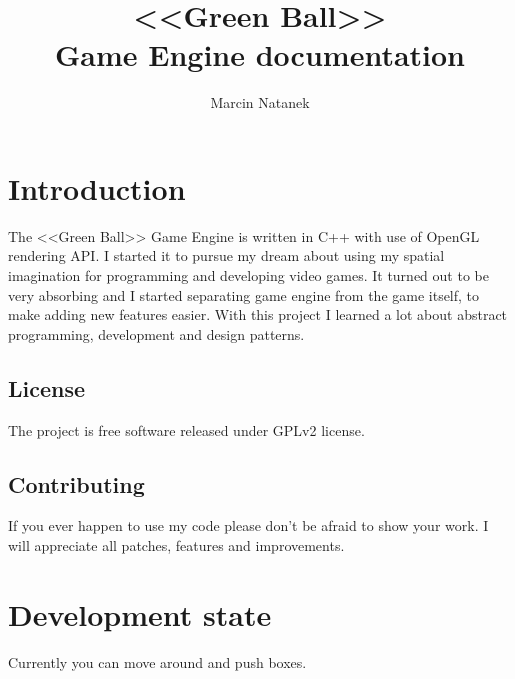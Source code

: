 \documentclass[11pt,a4paper,oneside]{report}
\title{<<Green Ball>>\\ Game Engine documentation}
\author{Marcin Natanek}
\begin{document}

\maketitle
\pagebreak
\tableofcontents
\pagebreak

\chapter{Introduction}
The <<Green Ball>> Game Engine is written in C++ with use of OpenGL rendering API. I started it to pursue my dream about using my spatial imagination for programming and developing video games. It turned out to be very absorbing and I started separating game engine from the game itself, to make adding new features easier. With this project I learned a lot about abstract programming, development and design patterns.

\section{License}
The project is free software released under GPLv2 license.

\section{Contributing}
If you ever happen to use my code please don't be afraid to show your work. I will appreciate all patches, features and improvements.

\chapter{Development state}
Currently you can move around and push boxes.
\end{document}
